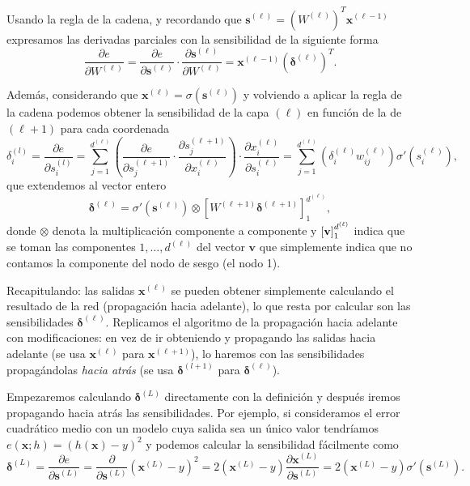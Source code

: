 Usando la regla de la cadena, y recordando que $\textbf{s}^{(\ell)} = (W^{(\ell)})^T \textbf{x}^{(\ell-1)}$ expresamos las derivadas parciales con la sensibilidad de la siguiente forma \cite{abu2012learning}
\begin{equation*}
  \dfrac{\partial e}{\partial W^{(\ell)}} = \dfrac{\partial e}{\partial \textbf{s}^{(\ell)}} \cdot \dfrac{\partial \textbf{s}^{(\ell)}}{\partial W^{(\ell)}} = \textbf{x}^{(\ell - 1)}(\pmb{\delta}^{(\ell)})^T.
  \label{eq:senpar}
\end{equation*}

Además, considerando que $\textbf{x}^{(\ell)} = \sigma(\textbf{s}^{(\ell)})$ y volviendo a aplicar la regla de la cadena podemos obtener la sensibilidad de la capa $(\ell)$ en función de la de $(\ell + 1)$ para cada coordenada
\begin{equation*}
  \delta_i^{(l)} = \dfrac{\partial e}{\partial s_i^{(l)}} =  \sum \limits^{d^{(\ell)}}_{j = 1} \left(\dfrac{\partial e}{\partial s_j^{(\ell + 1)}} \cdot \dfrac{\partial s_j^{(\ell + 1)}}{\partial x_i^{(\ell)}} \right) \cdot \dfrac{\partial x_i^{(\ell)}}{\partial s_i^{(\ell)}} = \sum \limits^{d^{(\ell)}}_{j = 1} \left(\delta^{(\ell)}_i w_{ij}^{(\ell)}\right) \sigma'(s_i^{(\ell)}),
  \label{eq:senpar2}
\end{equation*}
que extendemos al vector entero \cite{abu2012learning}
\begin{equation*}
  \pmb{\delta}^{(\ell)} = \sigma'(\textbf{s}^{(\ell)}) \otimes \left[W^{(\ell + 1)} \pmb{\delta}^{(\ell + 1)}\right]^{d^{(\ell)}}_1,
  \label{eq:senpar3}
\end{equation*}
donde $\otimes$ denota la multiplicación componente a componente y $\left[\empty\textbf{v}\right]^{d^{(\ell)}}_{1}$ indica que se toman las componentes $1, \ldots, d^{(\ell)}$ del vector $\textbf{v}$ que simplemente indica que no contamos la componente del nodo de sesgo (el nodo 1).

Recapitulando: las salidas $\textbf{x}^{(\ell)}$ se pueden obtener simplemente calculando el resultado de la red (propagación hacia adelante), lo que resta por calcular son las sensibilidades $\pmb{\delta}^{(\ell)}$. Replicamos el algoritmo de la propagación hacia adelante con modificaciones: en vez de ir obteniendo y propagando las salidas hacia adelante (se usa $\textbf{x}^{(\ell)}$ para $\textbf{x}^{(\ell + 1)}$), lo haremos con las sensibilidades propagándolas \emph{hacia atrás} (se usa $\pmb{\delta}^{(l+1)}$ para $\pmb{\delta}^{(\ell)}$).

Empezaremos calculando $\pmb{\delta}^{(L)}$ directamente con la definición y después iremos propagando hacia atrás las sensibilidades. Por ejemplo, si consideramos el error cuadrático medio con un modelo cuya salida sea un único valor tendríamos $e(\textbf{x}; h) = (h(\textbf{x}) - y)^2$ y podemos calcular la sensibilidad fácilmente como
\begin{equation*}
  \pmb{\delta}^{(L)} = \dfrac{\partial e}{\partial \textbf{s}^{(L)}} = \dfrac{\partial}{\partial \textbf{s}^{(L)}} (\textbf{x}^{(L)} - y)^2 = 2(\textbf{x}^{(L)} - y) \dfrac{\partial \textbf{x}^{(L)}}{\partial \textbf{s}^{(L)}} = 2(\textbf{x}^{(L)} - y)\sigma'(\textbf{s}^{(L)}).
  \label{eq:delta-ele}
\end{equation*}

